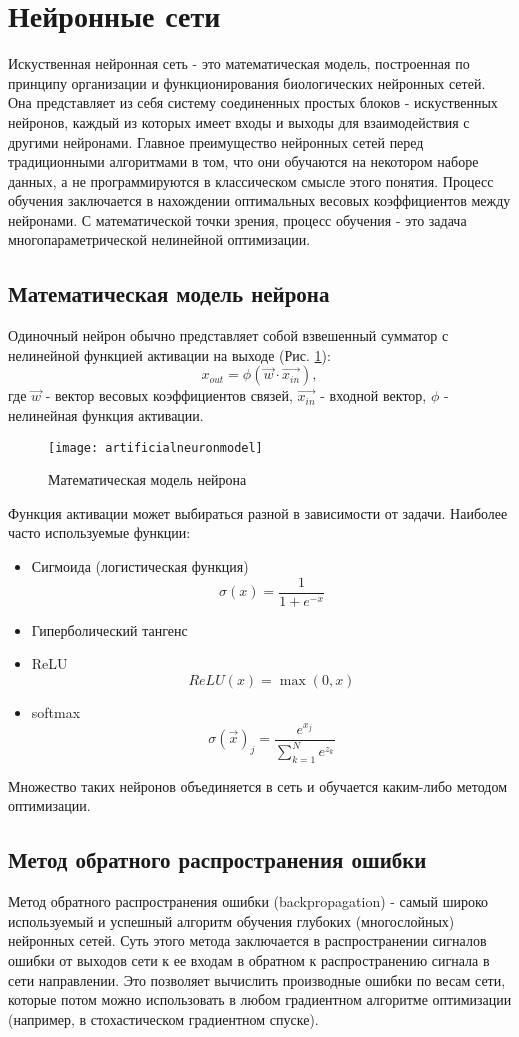 \section{Нейронные сети}
	Искуственная нейронная сеть - это математическая модель, построенная по принципу организации и функционирования биологических нейронных сетей. Она представляет из себя систему соединенных простых блоков - искуственных нейронов, каждый из которых имеет входы и выходы для взаимодействия с другими нейронами. Главное преимущество нейронных сетей перед традиционными алгоритмами в том, что они обучаются на некотором наборе данных, а не программируются в классическом смысле этого понятия. Процесс обучения заключается в нахождении оптимальных весовых коэффициентов между нейронами. С математической точки зрения, процесс обучения - это задача многопараметрической нелинейной оптимизации.
	\subsection{Математическая модель нейрона}
		Одиночный нейрон обычно представляет собой взвешенный сумматор с нелинейной функцией активации на выходе (Рис. \ref{artificial-neuron-model}):
		$$x_{out} = \phi(\vec{w} \cdotp \vec{x_{in}}),$$
		где $\vec{w}$ - вектор весовых коэффициентов связей, $\vec{x_{in}}$ - входной вектор, $\phi$ - нелинейная функция активации.
		\begin{figure}[h]
			\begin{center}
				\texttt{[image: artificialneuronmodel]}
			\end{center}
			\caption{Математическая модель нейрона}
			\label{artificial-neuron-model}
		\end{figure}
		
		Функция активации может выбираться разной в зависимости от задачи. Наиболее часто используемые функции:
		\begin{itemize}
			\item Сигмоида (логистическая функция)
					$$\sigma(x) = \frac{1}{1 + e^{-x}}$$
			\item Гиперболический тангенс
			\item ReLU
					$$ReLU(x) = \max(0, x)$$
			\item softmax
					$$\sigma(\vec{x})_j = \frac{e^{x_j}}{\sum_{k=1}^{N} e^{z_k}}$$
		\end{itemize}
		Множество таких нейронов объединяется в сеть и обучается каким-либо методом оптимизации.
	\subsection{Метод обратного распространения ошибки}
		Метод обратного распространения ошибки (backpropagation) - самый широко используемый и успешный алгоритм обучения глубоких (многослойных) нейронных сетей. Суть этого метода заключается в распространении сигналов ошибки от выходов сети к ее входам в обратном к распространению сигнала в сети направлении. Это позволяет вычислить производные ошибки по весам сети, которые потом можно использовать в любом градиентном алгоритме оптимизации (например, в стохастическом градиентном спуске).
		
